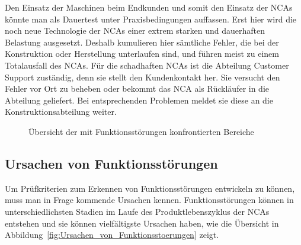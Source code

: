Den Einsatz der Maschinen beim Endkunden und somit den Einsatz der NCAs könnte man als Dauertest unter Praxisbedingungen auffassen. Erst hier wird die noch neue Technologie der NCAs einer extrem starken und dauerhaften Belastung ausgesetzt. Deshalb kumulieren hier sämtliche Fehler, die bei der Konstruktion oder Herstellung unterlaufen sind, und führen meist zu einem Totalausfall des NCAs. Für die schadhaften NCAs ist die Abteilung Customer Support zuständig, denn sie stellt den Kundenkontakt her. Sie  versucht den Fehler vor Ort zu beheben oder bekommt das NCA als Rückläufer in die Abteilung geliefert. Bei entsprechenden Problemen meldet sie diese an die Konstruktionsabteilung weiter.


\begin{figure}[H]
\center
{}

\caption{Übersicht der mit Funktionsstörungen konfrontierten Bereiche}
\label{fig:Uebersicht_ der_mit_Funktionsstoerungen_konfrontierten_Bereiche}
\end{figure}




\subsection{Ursachen von Funktionsstörungen}\label{cha:Ursachen_von_Funktionsstoerungen}

Um Prüfkriterien zum Erkennen von Funktionsstörungen entwickeln zu können, muss man in Frage kommende Ursachen kennen. Funktionsstörungen können in unterschiedlichsten Stadien im Laufe des Produktlebenszyklus der NCAs entstehen und sie können vielfältigste Ursachen haben, wie die Übersicht in Abbildung~\ref{fig:Ursachen_von_Funktionsstoerungen} zeigt.

